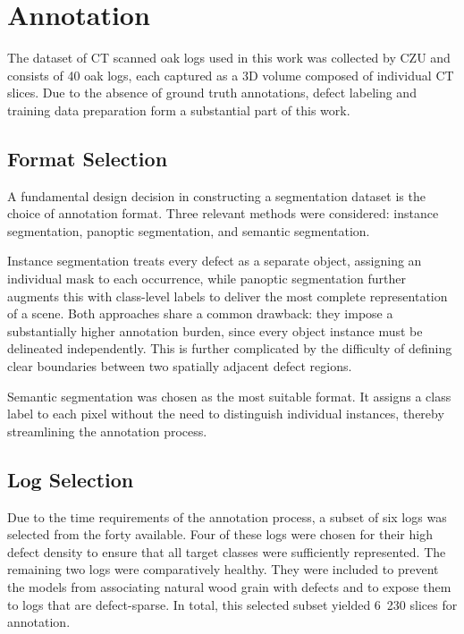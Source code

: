 \chapter{Annotation}
\label{chap:dataset_annotation}
The dataset of CT scanned oak logs used in this work was collected by CZU and consists of 40 oak logs, each captured as a 3D volume composed of individual CT slices. Due to the absence of ground truth annotations, defect labeling and training data preparation form a substantial part of this work.

\section{Format Selection}

A fundamental design decision in constructing a segmentation dataset is the
choice of annotation format. Three relevant methods were considered: instance
segmentation, panoptic segmentation, and semantic segmentation.

Instance segmentation treats every defect as a separate object, assigning an
individual mask to each occurrence, while panoptic segmentation further
augments this with class-level labels to deliver the most complete
representation of a scene. Both approaches share a common drawback: they
impose a substantially higher annotation burden, since every object instance
must be delineated independently. This is further complicated by the difficulty
of defining clear boundaries between two spatially adjacent defect regions.

Semantic segmentation was chosen as the most suitable format. It assigns a
class label to each pixel without the need to distinguish individual instances,
thereby streamlining the annotation process.

\section{Log Selection}

Due to the time requirements of the annotation process, a subset of six logs was selected from the forty available. Four of these logs were chosen for their high defect density to ensure that all target classes were sufficiently represented. The remaining two logs were comparatively healthy. They were included to prevent the models from associating natural wood grain with defects and to expose them to logs that are defect-sparse. In total, this selected subset yielded 6~230 slices for annotation.

